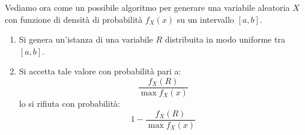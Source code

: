 Vediamo ora come un possibile algoritmo per generare una variabile aleatoria $X$
con funzione di densità di probabilità $f_X(x)$ su un intervallo $[a,b]$.
\begin{enumerate}
    \item Si genera un'istanza di una variabile $R$ distribuita in modo uniforme
          tra $[a,b]$.
    \item Si accetta tale valore con probabilità pari a:
          \begin{equation*}
              \frac{f_X(R)}{\max f_X(x)}
          \end{equation*}
          lo si rifiuta con probabilità:
          \begin{equation*}
              1 - \frac{f_X(R)}{\max f_X(x)}
          \end{equation*}
\end{enumerate}
